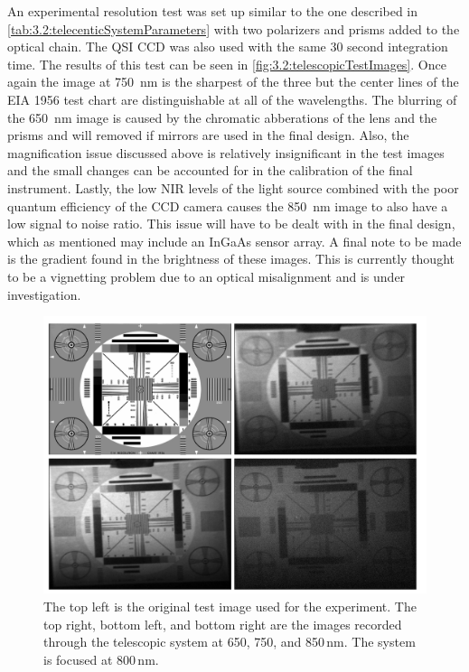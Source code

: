 An experimental resolution test was set up similar to the one described in \autoref{tab:3.2:telecenticSystemParameters} with two polarizers and prisms added to the optical chain. The QSI CCD was also used with the same 30 second integration time. The results of this test can be seen in \autoref{fig:3.2:telescopicTestImages}. Once again the image at 750~nm is the sharpest of the three but the center lines of the EIA 1956 test chart are distinguishable at all of the wavelengths. The blurring of the 650~nm image is caused by the chromatic abberations of the lens and the prisms and will removed if mirrors are used in the final design. Also, the magnification issue discussed above is relatively insignificant in the test images and the small changes can be accounted for in the calibration of the final instrument. Lastly, the low NIR levels of the light source combined with the poor quantum efficiency of the CCD camera causes the 850~nm image to also have a low signal to noise ratio. This issue will have to be dealt with in the final design, which as mentioned may include an InGaAs sensor array. A final note to be made is the gradient found in the brightness of these images. This is currently thought to be a vignetting problem due to an optical misalignment and is under investigation.

\begin{figure}[h!]
    \begin{center}
    \includegraphics[width=1.0\textwidth]{./Images/3-2-TelescopicTestImages.pdf}
    \caption[Telescoptic Prototype Laboratory Test Images]{The top left is the original test image used for the experiment. The top right, bottom left, and bottom right are the images recorded through the telescopic system at 650, 750, and 850\,nm. The system is focused at 800\,nm.}
   \label{fig:3.2:telescopicTestImages}
    \end{center}
\end{figure}


